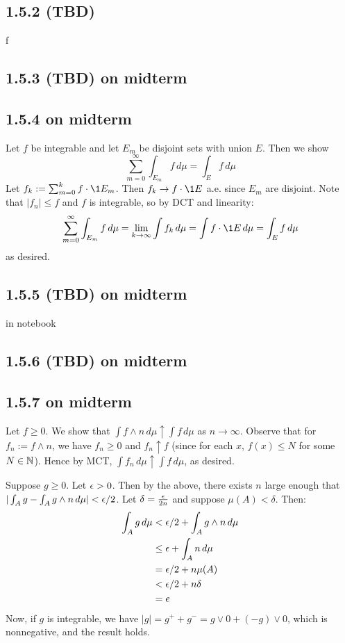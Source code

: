 \documentclass[11pt]{article}
\begin{document}
\subsection*{1.5.2 (TBD)}


f

\subsection*{1.5.3 (TBD) on midterm}






\subsection*{1.5.4 on midterm}

Let $f$ be integrable and let $E_m$ be disjoint sets with union $E$. Then we show \[\sum_{m=0}^{\infty} \int_{E_m}f \,d\mu = \int_{E}f \,d\mu \] Let $f_k := \sum_{m=0}^{k} f\cdot \1{E_m}$. Then $f_k \to f \cdot \1{E}$ a.e. since $E_m$ are disjoint. Note that $|f_n| \leq f$ and $f$ is integrable, so by DCT and linearity: \[\sum_{m=0}^{\infty} \int_{E_m}f \,d\mu = \lim_{k\to \infty}\int f_k \,d\mu = \int f \cdot \1{E} \,d\mu=\int_{E}f \,d\mu \] as desired.

\subsection*{1.5.5 (TBD) on midterm}


in notebook


\subsection*{1.5.6 (TBD) on midterm}





\subsection*{1.5.7 on midterm}

Let $f\geq 0$. We show that $\int f \wedge n \,d\mu \uparrow \int f \,d\mu$ as $n \to \infty$. Observe that for $f_n := f \wedge n$, we have $f_n \geq 0$ and $f_n\uparrow f$ (since for each $x$, $f(x) \leq N$ for some $N \in {\mathbb N}$). Hence by MCT, $\int f_n \,d\mu \uparrow \int f \,d\mu$, as desired. 

Suppose $g \geq 0$. Let $\epsilon >0$. Then by the above, there exists $n$ large enough that $|\int_A g  -\int_A g \wedge n\,d\mu| < \epsilon/2$. Let $\delta = \frac{\epsilon}{2n}$ and suppose $\mu(A) < \delta$. Then: \begin{align*}
    \int_A g  \,d\mu &< \epsilon/2 + \int_A g \wedge n\,d\mu  \\
    &\leq \epsilon + \int_A n\,d\mu  \\
    &= \epsilon/2 + n\mu(A) \\
    &< \epsilon/2 + n \delta \\
    &= e
\end{align*}
Now, if $g$ is integrable, we have $|g| = g^+ + g^- = g\vee 0 + (-g)\vee 0$, which is nonnegative, and the result holds.
\end{document}

